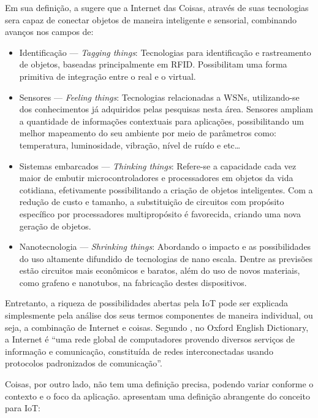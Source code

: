 \documentclass[twoside,english,brazilian]{UNISINOSmonografia}
\begin{document}
		Em sua definição, a  sugere que a Internet das Coisas, através de suas tecnologias sera capaz de conectar objetos de maneira inteligente e sensorial, combinando avanços nos campos de:
		\begin{itemize}
			\item Identificação --- \textit{Tagging things}: Tecnologias para identificação e rastreamento de objetos, baseadas principalmente em RFID. Possibilitam uma forma primitiva de integração entre o real e o virtual.
			
			\item Sensores --- \textit{Feeling things}: Tecnologias 
			relacionadas a WSNs, utilizando-se dos conhecimentos já adquiridos 
			pelas pesquisas nesta área. Sensores ampliam a quantidade de 
			informações contextuais para aplicações, possibilitando um melhor 
			mapeamento do seu ambiente por meio de parâmetros como: 
			temperatura, luminosidade, vibração, nível de ruído e etc\ldots
			
			\item Sistemas embarcados --- \textit{Thinking things}: Refere-se 
			a capacidade cada vez maior de embutir microcontroladores e 
			processadores em objetos da vida cotidiana, efetivamente 
			possibilitando a criação de objetos inteligentes. Com a redução de 
			custo e tamanho, a substituição de circuitos com propósito 
			específico por processadores multipropósito é favorecida, criando 
			uma nova geração de objetos.
			
			\item Nanotecnologia --- \textit{Shrinking things}: Abordando o 
			impacto e as possibilidades do uso altamente difundido de 
			tecnologias de nano escala. Dentre as previsões estão circuitos 
			mais econômicos e baratos, além do uso de novos materiais, como 
			grafeno e nanotubos, na fabricação destes dispositivos.
		\end{itemize}
		
		Entretanto, a riqueza de possibilidades abertas pela IoT pode ser 
		explicada simplesmente pela análise dos seus termos componentes de 
		maneira individual, ou seja, a combinação de Internet e coisas. 
		Segundo , no Oxford English Dictionary, a 
		Internet é ``uma rede global de computadores provendo diversos 
		serviços de informação e comunicação, constituída de redes 
		interconectadas usando protocolos padronizados de comunicação''.
		
		Coisas, por outro lado, não tem uma definição precisa, podendo variar 
		conforme o contexto e o foco da aplicação.  
		apresentam uma definição abrangente do conceito para IoT:
		
\end{document}
